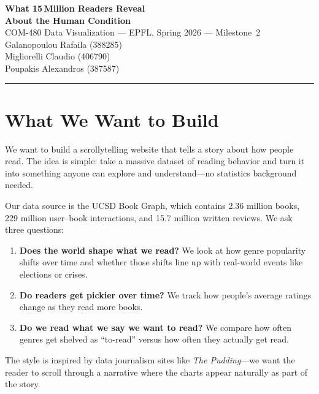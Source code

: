 \documentclass[11pt,a4paper]{article}
\begin{document}
\begin{center}
  {\Large\sffamily\bfseries What 15\,Million Readers Reveal\\About the Human Condition}\\[0.5em]
  {\normalsize COM-480 Data Visualization --- EPFL, Spring 2026 --- Milestone~2}\\[0.3em]
  {\small
    Galanopoulou Rafaila (388285)\\ 
    Migliorelli Claudio (406790)\\
    Poupakis Alexandros (387587)
  }
\end{center}

\vspace{0.2em}
\hrule
\vspace{0.6em}

\section{What We Want to Build}

We want to build a scrollytelling website that tells a story about how people read. The idea is simple: take a massive dataset of reading behavior and turn it into something anyone can explore and understand---no statistics background needed.

Our data source is the UCSD Book Graph, which contains 2.36 million books, 229 million user--book interactions, and 15.7 million written reviews. We ask three questions:

\begin{enumerate}[leftmargin=1.5em, itemsep=2pt]
  \item \textbf{Does the world shape what we read?} We look at how genre popularity shifts over time and whether those shifts line up with real-world events like elections or crises.
  \item \textbf{Do readers get pickier over time?} We track how people's average ratings change as they read more books.
  \item \textbf{Do we read what we say we want to read?} We compare how often genres get shelved as ``to-read'' versus how often they actually get read.
\end{enumerate}

The style is inspired by data journalism sites like \textit{The Pudding}---we want the reader to scroll through a narrative where the charts appear naturally as part of the story.

\end{document}
